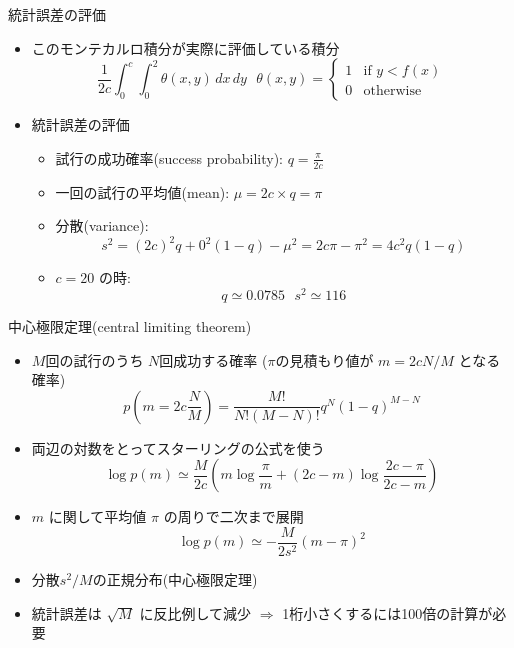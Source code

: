 \begin{frame}[t,fragile]{統計誤差の評価}
  \begin{itemize}
    \setlength{\itemsep}{1em}
  \item このモンテカルロ積分が実際に評価している積分
    \[
    \frac{1}{2c} \int_0^c \!\! \int_0^2 \!\! \theta(x,y) \, dx \, dy
    \ \ \ \theta(x,y) = \begin{cases} 1 & \text{if $y < f(x)$} \\ 0 & \text{otherwise} \end{cases}
    \]
  \item 統計誤差の評価
    \begin{itemize}
      \item 試行の成功確率(success probability): $q=\frac{\pi}{2c}$
      \item 一回の試行の平均値(mean): $\mu = 2c \times q = \pi$
      \item 分散(variance):
        \[ s^2 = (2c)^2q + 0^2(1-q) - \mu^2 = 2c\pi-\pi^2 = 4c^2 q(1-q) \]
      \item $c=20$ の時:
        \[ q \simeq 0.0785 \ \ \ s^2 \simeq 116
        \]
    \end{itemize}
  \end{itemize}
\end{frame}

\begin{frame}[t,fragile]{中心極限定理(central limiting theorem)}
  \begin{itemize}
  \item $M$回の試行のうち $N$回成功する確率 ($\pi$の見積もり値が $m=2cN/M$ となる確率)
    \[
    p(m=2c\frac{N}{M}) = \frac{M!}{N!(M-N)!} q^N (1-q)^{M-N}
    \]
  \item 両辺の対数をとってスターリングの公式を使う
    \[
    \log p(m) \simeq \frac{M}{2c} (m \log \frac{\pi}{m} + (2c-m)\log \frac{2c-\pi}{2c-m})
    \]
  \item $m$ に関して平均値 $\pi$ の周りで二次まで展開
    \[
    \log p(m) \simeq -\frac{M}{2s^2}(m-\pi)^2
    \]
  \item 分散$s^2/M$の正規分布(中心極限定理)
  \item 統計誤差は $\sqrt{M}$ に反比例して減少 $\Rightarrow$ 1桁小さくするには100倍の計算が必要
  \end{itemize}
\end{frame}

